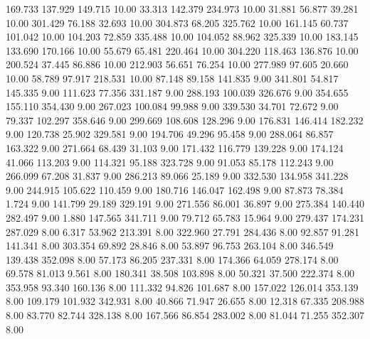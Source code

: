  169.733  137.929  149.715        10.00
  33.313  142.379  234.973        10.00
  31.881   56.877   39.281        10.00
 301.429   76.188   32.693        10.00
 304.873   68.205  325.762        10.00
 161.145   60.737  101.042        10.00
 104.203   72.859  335.488        10.00
 104.052   88.962  325.339        10.00
 183.145  133.690  170.166        10.00
  55.679   65.481  220.464        10.00
 304.220  118.463  136.876        10.00
 200.524   37.445   86.886        10.00
 212.903   56.651   76.254        10.00
 277.989   97.605   20.660        10.00
  58.789   97.917  218.531        10.00
  87.148   89.158  141.835         9.00
 341.801   54.817  145.335         9.00
 111.623   77.356  331.187         9.00
 288.193  100.039  326.676         9.00
 354.655  155.110  354.430         9.00
 267.023  100.084   99.988         9.00
 339.530   34.701   72.672         9.00
  79.337  102.297  358.646         9.00
 299.669  108.608  128.296         9.00
 176.831  146.414  182.232         9.00
 120.738   25.902  329.581         9.00
 194.706   49.296   95.458         9.00
 288.064   86.857  163.322         9.00
 271.664   68.439   31.103         9.00
 171.432  116.779  139.228         9.00
 174.124   41.066  113.203         9.00
 114.321   95.188  323.728         9.00
  91.053   85.178  112.243         9.00
 266.099   67.208   31.837         9.00
 286.213   89.066   25.189         9.00
 332.530  134.958  341.228         9.00
 244.915  105.622  110.459         9.00
 180.716  146.047  162.498         9.00
  87.873   78.384    1.724         9.00
 141.799   29.189  329.191         9.00
 271.556   86.001   36.897         9.00
 275.384  140.440  282.497         9.00
   1.880  147.565  341.711         9.00
  79.712   65.783   15.964         9.00
 279.437  174.231  287.029         8.00
   6.317   53.962  213.391         8.00
 322.960   27.791  284.436         8.00
  92.857   91.281  141.341         8.00
 303.354   69.892   28.846         8.00
  53.897   96.753  263.104         8.00
 346.549  139.438  352.098         8.00
  57.173   86.205  237.331         8.00
 174.366   64.059  278.174         8.00
  69.578   81.013    9.561         8.00
 180.341   38.508  103.898         8.00
  50.321   37.500  222.374         8.00
 353.958   93.340  160.136         8.00
 111.332   94.826  101.687         8.00
 157.022  126.014  353.139         8.00
 109.179  101.932  342.931         8.00
  40.866   71.947   26.655         8.00
  12.318   67.335  208.988         8.00
  83.770   82.744  328.138         8.00
 167.566   86.854  283.002         8.00
  81.044   71.255  352.307         8.00
